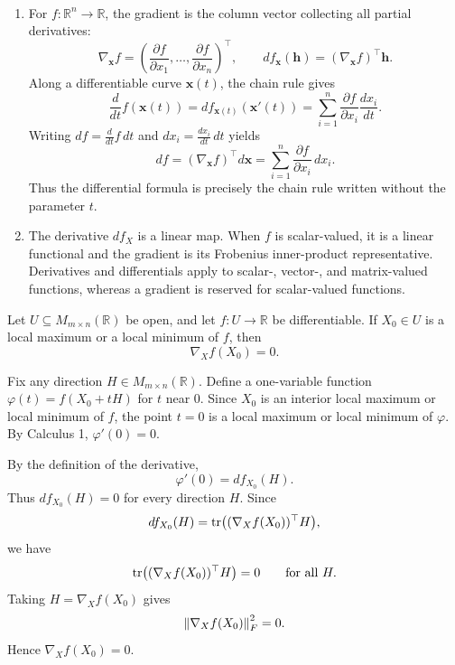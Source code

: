 \begin{remark}\ \vspace{-2em}
\begin{enumerate}
    \item For $f:\mathbb{R}^n\to\mathbb{R}$, the gradient is the column vector collecting all partial derivatives:
    \[
        \nabla_{\mathbf{x}}f
        =
        \left(
            \frac{\partial f}{\partial x_1},\ldots,
            \frac{\partial f}{\partial x_n}
        \right)^{\top},
        \qquad
        df_{\mathbf{x}}(\mathbf{h})
        =
        (\nabla_{\mathbf{x}}f)^{\top}\mathbf{h}.
    \]
    Along a differentiable curve $\mathbf{x}(t)$, the chain rule gives
    \[
        \frac{d}{dt}f(\mathbf{x}(t))
        =
        df_{\mathbf{x}(t)}(\mathbf{x}'(t))
        =
        \sum_{i=1}^n
        \frac{\partial f}{\partial x_i}\frac{dx_i}{dt}.
    \]
    Writing $df=\frac{d}{dt}f\,dt$ and $dx_i=\frac{dx_i}{dt}\,dt$ yields
    \[
        df=(\nabla_{\mathbf{x}}f)^{\top}d\mathbf{x}
        =\sum_{i=1}^n\frac{\partial f}{\partial x_i}\,dx_i.
    \]
    Thus the differential formula is precisely the chain rule written without the parameter $t$.

    \item The derivative $df_X$ is a linear map. When $f$ is scalar-valued, it is a linear functional and the gradient is its Frobenius inner-product representative. Derivatives and differentials apply to scalar-, vector-, and matrix-valued functions, whereas a gradient is reserved for scalar-valued functions.
\end{enumerate}
\end{remark}

\begin{theorem}
Let $U\subseteq M_{m\times n}(\mathbb{R})$ be open, and let $f:U\to\mathbb{R}$ be differentiable.
If $X_0\in U$ is a local maximum or a local minimum of $f$, then
\[
    \nabla_X f(X_0)=0.
\]
\end{theorem}

\begin{pfbox}
Fix any direction $H\in M_{m\times n}(\mathbb{R})$. Define a one-variable function
$\varphi(t)=f(X_0+tH)$ for $t$ near $0$.
Since $X_0$ is an interior local maximum or local minimum of $f$, the point $t=0$ is a local maximum or local minimum of $\varphi$. By Calculus 1, $\varphi'(0)=0$.

By the definition of the derivative,
\[
    \varphi'(0)=df_{X_0}(H).
\]
Thus $df_{X_0}(H)=0$ for every direction $H$.
Since
\[
    df_{X_0}(H)=\operatorname{tr}\bigl((\nabla_X f(X_0))^{\top}H\bigr),
\]
we have
\[
    \operatorname{tr}\bigl((\nabla_X f(X_0))^{\top}H\bigr)=0
    \qquad\text{for all }H.
\]
Taking $H=\nabla_X f(X_0)$ gives
\[
    \left\lVert \nabla_X f(X_0) \right\rVert_F^2=0.
\]
Hence $\nabla_X f(X_0)=0$.
\end{pfbox}


